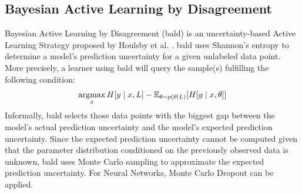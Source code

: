 \subsection{Bayesian Active Learning by Disagreement}
\label{sec:Related_work:Active_Learning:BALD}
Bayesian Active Learning by Disagreement (\gls{bald}) is an uncertainty-based Active Learning Strategy proposed by Houlsby et al. 
\cite{houlsby2011bayesian}. \gls{bald} uses Shannon's entropy \cite{cover1991information} to determine a model's prediction uncertainty for a given
unlabeled data point. More precisely, a learner using \gls{bald} will query the sample(s) fulfilling the following condition:
\begin{equation}
    \operatorname*{\arg\!\max}_x H[y \mid x, L] - \mathbb{E}_{\theta \sim p(\theta \mid L)} [H[y \mid x, \theta]]
\end{equation}
Informally, \gls{bald} selects those data points with the biggest gap between the model's actual prediction uncertainty and the model's expected
prediction uncertainty. Since the expected prediction uncertainty cannot be computed given that the parameter distribution conditioned on the
previously observed data is unknown, \gls{bald} uses Monte Carlo sampling to approximate the expected prediction uncertainty. For Neural Networks, Monte
Carlo Dropout \cite{gal2016dropout} can be applied.

